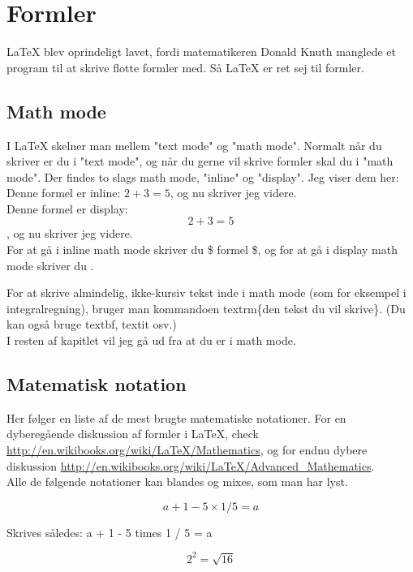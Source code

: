 \chapter{Formler}
\label{chap:formler}
LaTeX blev oprindeligt lavet, fordi matematikeren Donald Knuth manglede et program til at skrive flotte formler med. Så LaTeX er ret sej til formler.

\section{Math mode}
I LaTeX skelner man mellem "text mode" og "math mode". Normalt når du skriver er du i "text mode", og når du gerne vil skrive formler skal du i "math mode". Der findes to slags math mode, "inline" og "display". Jeg viser dem her:\\

\indent Denne formel er inline: $2 + 3 = 5$, og nu skriver jeg videre.\\
\indent Denne formel er display: \[2 + 3 = 5\]\indent, og nu skriver jeg videre.\\

\noindent For at gå i inline math mode skriver du \$ formel \$, og for at gå i display math mode skriver du \bs [ formel \bs ].

For at skrive almindelig, ikke-kursiv tekst inde i math mode (som for eksempel i integralregning), bruger man kommandoen \bs textrm\{den tekst du vil skrive\}. (Du kan også bruge \bs textbf, \bs textit osv.)\\

\noindent
I resten af kapitlet vil jeg gå ud fra at du er i math mode.

\section{Matematisk notation}
Her følger en liste af de mest brugte matematiske notationer. For en dyberegående diskussion af formler i LaTeX, check \url{http://en.wikibooks.org/wiki/LaTeX/Mathematics}, og for endnu dybere diskussion \url{http://en.wikibooks.org/wiki/LaTeX/Advanced_Mathematics}.\\

\noindent
Alle de følgende notationer kan blandes og mixes, som man har lyst.

\[a + 1 - 5 \times 1 / 5 = a\]

\noindent
Skrives således: a + 1 - 5 \bs times 1 / 5 = a

\[ 2^2 = \sqrt{16} \]

